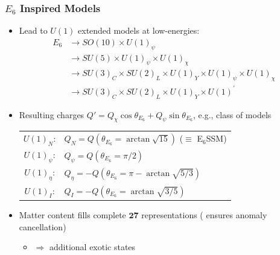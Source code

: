\documentclass[10pt,aspectratio=169]{beamer}
\begin{document}
\begin{frame}
  \frametitle{$E_6$ Inspired Models}
  \begin{itemize} \itemsep1em
     \item Lead to $U(1)$ extended models at low-energies:
      \begin{align*}
        E_6&\longrightarrow SO(10)\times U(1)_\psi \\
        &\longrightarrow SU(5)\times U(1)_\psi\times U(1)_\chi\\
        &\longrightarrow SU(3)_C\times SU(2)_L\times U(1)_Y\times
        U(1)_\psi\times U(1)_\chi\\
        &\longrightarrow SU(3)_C\times SU(2)_L\times U(1)_Y\times
        U(1)^\prime
      \end{align*}
    \item Resulting charges $Q' = Q_\chi \cos \theta_{E_6}
      + Q_\psi \sin \theta_{E_6}$, e.g., class of models
      \begin{table}[h]
        \begin{tabular}{cl}
          $U(1)_N$: & $Q_N = Q(\theta_{E_6} = \arctan\sqrt{15})$
            ($\equiv$ E$_6$SSM) \\
          $U(1)_\psi$: & $Q_\psi = Q(\theta_{E_6} = \pi / 2)$\\
          $U(1)_\eta$: & $Q_\eta = -Q(\theta_{E_6} = \pi -
            \arctan\sqrt{5/3})$\\
          $U(1)_I$: & $Q_I = -Q(\theta_{E_6} = \arctan\sqrt{3/5})$
        \end{tabular}
      \end{table}
    \item Matter content fills complete $\mathbf{27}$ representations
      ({\color{blue} ensures anomaly cancellation})
      \begin{itemize}
        \item $\Rightarrow$ additional exotic states
      \end{itemize}
  \end{itemize}
\end{frame}
\end{document}

